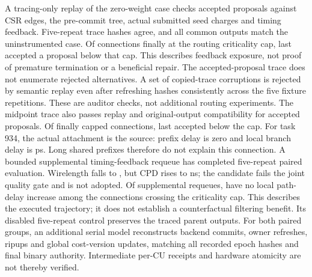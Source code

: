 \documentclass[10pt]{article}
\begin{document}
A tracing-only replay of the zero-weight case checks \TraceAccepted{}
accepted proposals against CSR edges, the pre-commit tree, actual submitted
seed charges and timing feedback. Five-repeat trace hashes agree, and all
\TraceCompatibleArtifacts{} common outputs match the uninstrumented case.
Of \TraceFinalCapped{} connections finally at the routing criticality cap,
\TraceBelowFinalCap{} last accepted a proposal below that cap. This describes
feedback exposure, not proof of premature termination or a beneficial repair.
The accepted-proposal trace does not enumerate rejected alternatives.
A set of \TraceCorruptions{} copied-trace corruptions is rejected by semantic replay even after
refreshing hashes consistently across the five fixture repetitions. These
are auditor checks, not additional routing experiments.
The midpoint trace also passes replay and original-output compatibility for
\TraceMidAccepted{} accepted proposals. Of \TraceMidCapped{} finally capped
connections, \TraceMidBelowCap{} last accepted below the cap. For task 934,
the actual attachment is the source: prefix delay is zero and local branch
delay is \TraceMidExampleBranch{} ps. Long shared prefixes therefore do not
explain this connection. A bounded supplemental timing-feedback requeue has
completed five-repeat paired evaluation. Wirelength falls to
\FeedbackWL{}, but CPD rises to \FeedbackCPD{} ns; the candidate fails the
joint quality gate and is not adopted. Of \FeedbackSupplemental{} supplemental
requeues, \FeedbackUnchanged{} have no local path-delay increase among the
connections crossing the criticality cap. This describes the executed
trajectory; it does not establish a counterfactual filtering benefit.
Its disabled five-repeat control preserves the traced parent outputs.
For both paired groups, an additional serial model reconstructs backend commits, owner refreshes,
ripups and global cost-version updates, matching all recorded epoch hashes
and final binary authority. Intermediate per-CU receipts and hardware
atomicity are not thereby verified.
\end{document}
